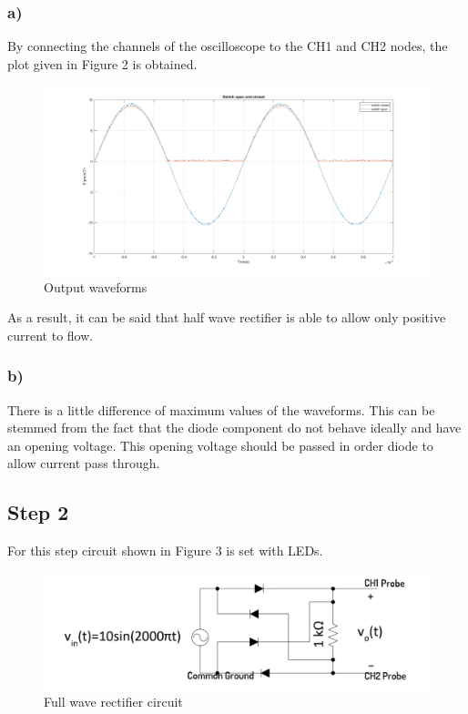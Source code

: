 \documentclass[letterpaper,12pt]{article}
\begin{document}
\subsubsection{a)}
By connecting the channels of the oscilloscope to the CH1 and CH2 nodes, the plot given in Figure 2 is obtained.
\begin{figure}[H]
	\centering
   \includegraphics[width=1\textwidth]{1a_plot.png}
   \caption{Output waveforms}
\end{figure}
As a result, it can be said that half wave rectifier is able to allow only positive current to flow.

\subsubsection{b)}
There is a little difference of maximum values of the waveforms. This can be stemmed from the fact that the diode component do not behave ideally and have an opening voltage. This opening voltage should be passed in order diode to allow current pass through. 
\subsection{Step 2}
For this step circuit shown in Figure 3 is set with LEDs. 
\begin{figure}[H]
	\centering
   \includegraphics[width=1\textwidth]{full_vave_sch.png}
   \caption{Full wave rectifier circuit}
\end{figure}
\end{document}
